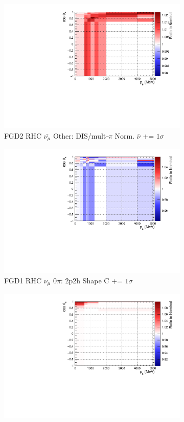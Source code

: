 \begin{figure}
\begin{subfigure}{.32\textwidth}
  \includegraphics[width=0.85\linewidth]{figs/sig/FGD2_anti-numuCC_other_CC_DIS_MultPi_Norm_Nubar_+1sig.pdf}
  \caption{FGD2 RHC $\bar{\nu_{\mu}}$ Other: DIS/mult-$\pi$ Norm. $\bar{\nu}$ += $1\sigma$}
  \label{fig:sigvar_FGD2_anti-numuCC_other}
\end{subfigure}
\begin{subfigure}{.32\textwidth}
  \centering
  \includegraphics[width=0.85\linewidth]{figs/sig/FGD1_NuMuBkg_CC0pi_in_AntiNu_Mode_2p2h_shape_C_+1sig.pdf}
  \caption{FGD1 RHC $\nu_{\mu}$ 0$\pi$: 2p2h Shape C += $1\sigma$}
  \label{fig:sigvar_FGD1_NuMuBkg_CC0pi_in_AntiNu_Mode}
\end{subfigure}
\begin{subfigure}{.32\textwidth}
  \centering
  \includegraphics[width=0.85\linewidth]{figs/sig/FGD1_NuMuBkg_CC1pi_in_AntiNu_Mode_CC_Coh_C_+1sig.pdf}

\end{subfigure}
\end{figure}
